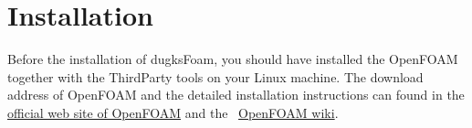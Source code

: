 
\chapter{Installation}

\label{inst}
Before the installation of dugksFoam, you should have installed the OpenFOAM together with the ThirdParty tools on your Linux machine.
The download address of OpenFOAM and the detailed installation instructions can found in the
\href{http://openfoam.org/download/}{official web site of OpenFOAM} and the ~\href{https://openfoamwiki.net/index.php/Main_Page}{OpenFOAM wiki}.

